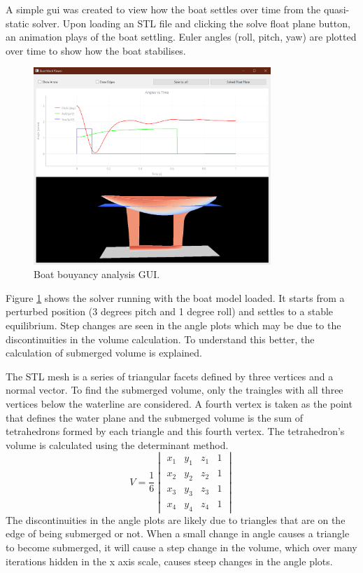 \documentclass{article}
\begin{document}
A simple gui was created to view how the boat settles over time from the quasi-static solver.
Upon loading an STL file and clicking the solve float plane button, an animation plays of the boat settling.
Euler angles (roll, pitch, yaw) are plotted over time to show how the boat stabilises.

\begin{figure}[H]
    \centering
    \includegraphics[width=0.8\textwidth]{figures/XqMwPnm3wm.png}
    \caption{Boat bouyancy analysis GUI.}
    \label{fig:boat_gui}
\end{figure}

Figure \ref{fig:boat_gui} shows the solver running with the boat model loaded.
It starts from a perturbed position (3 degrees pitch and 1 degree roll) and settles to a stable equilibrium.
Step changes are seen in the angle plots which may be due to the discontinuities in the volume calculation.
To understand this better, the calculation of submerged volume is explained.

The STL mesh is a series of triangular facets defined by three vertices and a normal vector.
To find the submerged volume, only the traingles with all three vertices below the waterline are considered.
A fourth vertex is taken as the point that defines the water plane and the submerged volume is the sum of tetrahedrons formed by each triangle and this fourth vertex.
The tetrahedron's volume is calculated using the determinant method.
\begin{equation}
    V = \frac{1}{6} \begin{vmatrix}
        x_1 & y_1 & z_1 & 1 \\
        x_2 & y_2 & z_2 & 1 \\
        x_3 & y_3 & z_3 & 1 \\
        x_4 & y_4 & z_4 & 1
    \end{vmatrix}
\end{equation}
The discontinuities in the angle plots are likely due to triangles that are on the edge of being submerged or not.
When a small change in angle causes a triangle to become submerged, it will cause a step change in the volume,
which over many iterations hidden in the x axis scale, causes steep changes in the angle plots.
\end{document}
